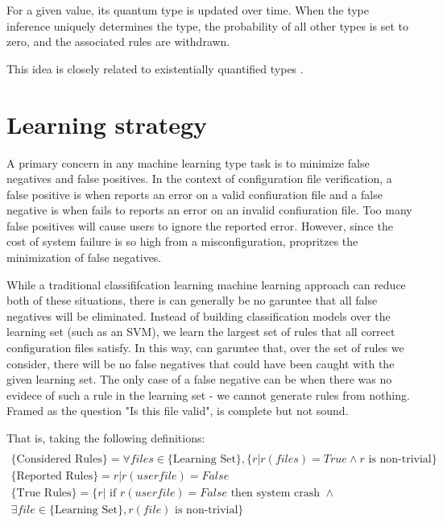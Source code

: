 For a given value, its quantum type is updated over time. When the type inference uniquely determines the type, the probability of all other types is set to zero, and  the associated rules are withdrawn.

This idea is closely related to existentially quantified types \cite{Launchbury93lazyfunctional}.


\section{Learning strategy}

A primary concern in any machine learning type task is to minimize false negatives and false positives.
In the context of configuration file verification,
  a false positive is when \app reports an error on a valid confiuration file and
  a false negative is when \app fails to reports an error on an invalid confiuration file.
Too many false positives will cause users to ignore the reported error\cite{}.
However, since the cost of system failure is so high from a misconfiguration, \app propritzes the minimization of false negatives.

While a traditional classififcation learning machine learning approach can reduce both of these situations, there is can generally be no garuntee that all false negatives will be eliminated.
Instead of building classification models over the learning set (such as an SVM), we learn the largest set of rules that all correct configuration files satisfy.
In this way, \app can garuntee that, over the set of rules we consider, there will be no false negatives that could have been caught with the given learning set.
The only case of a false negative can be when there was no evidece of such a rule in the learning set - we cannot generate rules from nothing.
Framed as the question "Is this file valid", \app is complete but not sound. 

That is, taking the following definitions:
\begin{multline*}\\
\text{\{Considered Rules\}} = \forall files \in \text{\{Learning Set\}}, \{ r | r(files) = True \land r \text{ is non-trivial}\}\\
\text{\{Reported Rules\}} = {r | r(userfile)=False } \\
\text{\{True Rules\}} = \{r | \text{ if } r(userfile)=False \text{ then system crash } \land \\
   \exists file \in \text{\{Learning Set\}}, r(file) \text{ is non-trivial}\}
\end{multline*}

